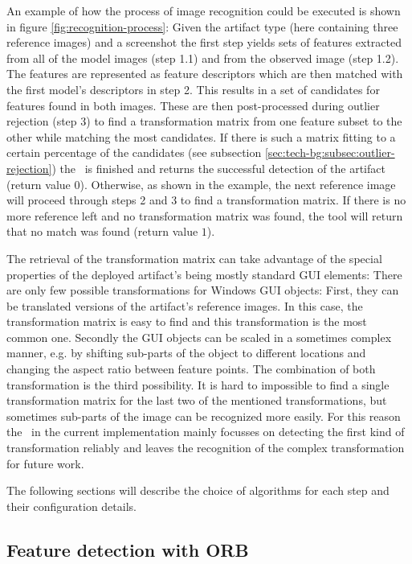 An example of how the process of image recognition could be executed is shown in figure \ref{fig:recognition-process}: Given the artifact type (here containing three reference images) and a screenshot the first step yields sets of features extracted from all of the model images (step 1.1) and from the observed image (step 1.2). The features are represented as feature descriptors which are then matched with the first model's descriptors in step 2. This results in a set of candidates for features found in both images. These are then post-processed during outlier rejection (step 3) to find a transformation matrix from one feature subset to the other while matching the most candidates. If there is such a matrix fitting to a certain percentage of the candidates (see subsection \ref{sec:tech-bg:subsec:outlier-rejection}) the \vd~is finished and returns the successful detection of the artifact (return value $0$). Otherwise, as shown in the example, the next reference image will proceed through steps 2 and 3 to find a transformation matrix. If there is no more reference left and no transformation matrix was found, the tool will return that no match was found (return value $1$).

The retrieval of the transformation matrix can take advantage of the special properties of the deployed artifact's being mostly standard GUI elements: There are only few possible transformations for Windows GUI objects: First, they can be translated versions of the artifact's reference images. In this case, the transformation matrix is easy to find and this transformation is the most common one. Secondly the GUI objects can be scaled in a sometimes complex manner, e.g. by shifting sub-parts of the object to different locations and changing the aspect ratio between feature points. The combination of both transformation is the third possibility. It is hard to impossible to find a single transformation matrix for the last two of the mentioned transformations, but sometimes sub-parts of the image can be recognized more easily. For this reason the \vd~in the current implementation mainly focusses on detecting the first kind of transformation reliably and leaves the recognition of the complex transformation for future work.

The following sections will describe the choice of algorithms for each step and their configuration details.

\subsection{Feature detection with ORB}\label{sec:tech-bg:subsec:feature-detection}

